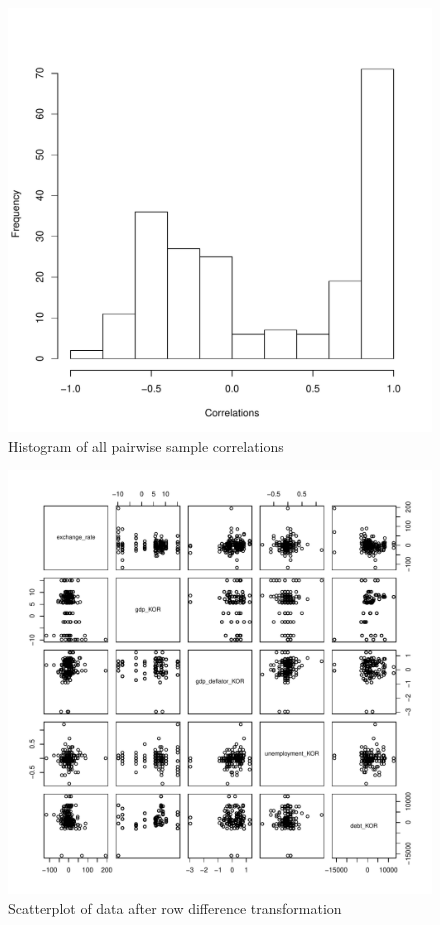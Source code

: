 \documentclass[12pt]{article}
\begin{document}
\begin{figure}
  \centering
    \includegraphics{correlation.pdf}
  \caption{Histogram of all pairwise sample correlations}
  \label{fig:correlation}
\end{figure}

\begin{figure}
  \centering
    \includegraphics{diff_scatterplot.pdf}
  \caption{Scatterplot of data after row difference transformation}
  \label{fig:diff_scatterplot}
\end{figure}
\end{document}
